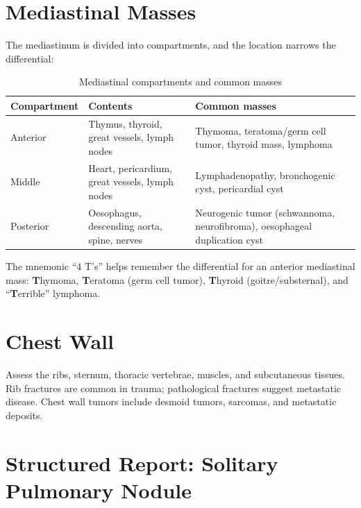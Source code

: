 \section{Mediastinal Masses}
The mediastinum is divided into compartments, and the location narrows the differential:

\begin{table}[h]
\centering
\caption{Mediastinal compartments and common masses}
\begin{tabular}{p{3cm} p{5cm} p{4.5cm}}
\hline
\textbf{Compartment} & \textbf{Contents} & \textbf{Common masses} \\
\hline
Anterior & Thymus, thyroid, great vessels, lymph nodes & Thymoma, teratoma/germ cell tumor, thyroid mass, lymphoma \\
Middle & Heart, pericardium, great vessels, lymph nodes & Lymphadenopathy, bronchogenic cyst, pericardial cyst \\
Posterior & Oesophagus, descending aorta, spine, nerves & Neurogenic tumor (schwannoma, neurofibroma), oesophageal duplication cyst \\
\hline
\end{tabular}
\end{table}

\begin{pearlbox}
The mnemonic ``4 T's'' helps remember the differential for an anterior mediastinal mass: \textbf{T}hymoma, \textbf{T}eratoma (germ cell tumor), \textbf{T}hyroid (goitre/substernal), and ``\textbf{T}errible'' lymphoma.
\end{pearlbox}


\section{Chest Wall}
Assess the ribs, sternum, thoracic vertebrae, muscles, and subcutaneous tissues. Rib fractures are common in trauma; pathological fractures suggest metastatic disease. Chest wall tumors include desmoid tumors, sarcomas, and metastatic deposits.


\section{Structured Report: Solitary Pulmonary Nodule}

